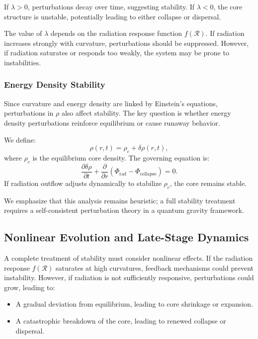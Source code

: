 If \( \lambda > 0 \), perturbations decay over time, suggesting stability. If \( \lambda < 0 \), the core structure is unstable, potentially leading to either collapse or dispersal.

The value of \( \lambda \) depends on the radiation response function \( f(\mathcal{R}) \). If radiation increases strongly with curvature, perturbations should be suppressed. However, if radiation saturates or responds too weakly, the system may be prone to instabilities.

\subsubsection{Energy Density Stability}
Since curvature and energy density are linked by Einstein’s equations, perturbations in \( \rho \) also affect stability. The key question is whether energy density perturbations reinforce equilibrium or cause runaway behavior.

We define:
\begin{equation}
    \rho(r,t) = \rho_c + \delta \rho(r,t),
\end{equation}
where \( \rho_c \) is the equilibrium core density. The governing equation is:
\begin{equation}
    \frac{\partial \delta \rho}{\partial t} + \frac{\partial}{\partial r} \left( \Phi_\text{rad} - \Phi_\text{collapse} \right) = 0.
\end{equation}
If radiation outflow adjusts dynamically to stabilize \( \rho_c \), the core remains stable.

We emphasize that this analysis remains heuristic; a full stability treatment requires a self-consistent perturbation theory in a quantum gravity framework.

\subsection{Nonlinear Evolution and Late-Stage Dynamics}
A complete treatment of stability must consider nonlinear effects. If the radiation response \( f(\mathcal{R}) \) saturates at high curvatures, feedback mechanisms could prevent instability. However, if radiation is not sufficiently responsive, perturbations could grow, leading to:
\begin{itemize}
    \item A gradual deviation from equilibrium, leading to core shrinkage or expansion.
    \item A catastrophic breakdown of the core, leading to renewed collapse or dispersal.
\end{itemize}


